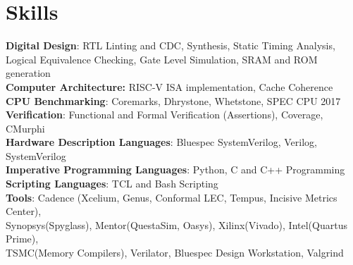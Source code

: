 \section{\sc Skills}

{\bf{Digital Design}}: RTL Linting and CDC, Synthesis, Static Timing Analysis, Logical Equivalence Checking, Gate Level Simulation, SRAM and ROM generation \\
{\bf{Computer Architecture:}} RISC-V ISA implementation, Cache Coherence\\
{\bf{CPU Benchmarking}}: Coremarks, Dhrystone, Whetstone, SPEC CPU 2017 \\
{\bf{Verification}}: Functional and Formal Verification (Assertions), Coverage, CMurphi\\
{\bf{Hardware Description Languages}}: Bluespec SystemVerilog, Verilog, SystemVerilog \\
{\bf{Imperative Programming Languages}}: Python, C and C++ Programming \\
{\bf{Scripting Languages}}: TCL and Bash Scripting \\
{\bf{Tools}}: Cadence (Xcelium, Genus, Conformal LEC, Tempus, Incisive Metrics Center), \\ Synopsys(Spyglass), Mentor(QuestaSim, Oasys), Xilinx(Vivado), Intel(Quartus Prime), \\ TSMC(Memory Compilers), Verilator, Bluespec Design Workstation, Valgrind 

\endinput
